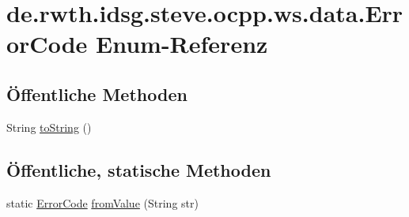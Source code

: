 \hypertarget{enumde_1_1rwth_1_1idsg_1_1steve_1_1ocpp_1_1ws_1_1data_1_1_error_code}{\section{de.\-rwth.\-idsg.\-steve.\-ocpp.\-ws.\-data.\-Error\-Code Enum-\/\-Referenz}
\label{enumde_1_1rwth_1_1idsg_1_1steve_1_1ocpp_1_1ws_1_1data_1_1_error_code}
}
\subsection*{Öffentliche Methoden}
\begin{DoxyCompactItemize}
\item 
String \hyperlink{enumde_1_1rwth_1_1idsg_1_1steve_1_1ocpp_1_1ws_1_1data_1_1_error_code_a36738aa11b27ecc8597edfe006af4dc3}{to\-String} ()
\end{DoxyCompactItemize}
\subsection*{Öffentliche, statische Methoden}
\begin{DoxyCompactItemize}
\item 
static \hyperlink{enumde_1_1rwth_1_1idsg_1_1steve_1_1ocpp_1_1ws_1_1data_1_1_error_code}{Error\-Code} \hyperlink{enumde_1_1rwth_1_1idsg_1_1steve_1_1ocpp_1_1ws_1_1data_1_1_error_code_a1b6b9483c77e5aafe90a205c98ed46fd}{from\-Value} (String str)
\end{DoxyCompactItemize}
